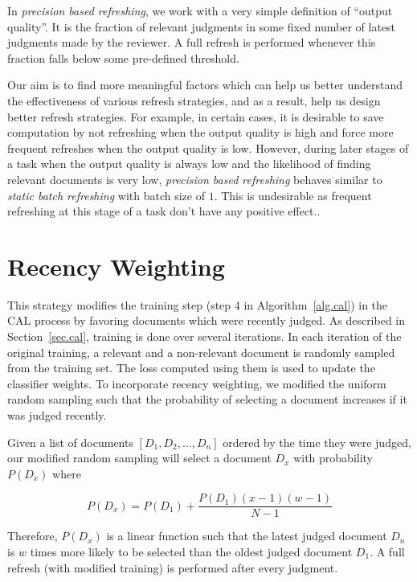 In \textit{precision based refreshing}, we work with a very simple definition of
``output quality''. It is the fraction of relevant judgments in some fixed
number of latest judgments made by the reviewer. A full refresh is performed
whenever this fraction falls below some pre-defined threshold.

Our aim is to find more meaningful factors which can help us better understand
the effectiveness of various refresh strategies, and as a result, help us design
better refresh strategies. For example, in certain cases, it is desirable to
save computation by not refreshing when the output quality is high and force
more frequent refreshes when the output quality is low. However, during later
stages of a task when the output quality is always low and the likelihood of
finding relevant documents is very low, \textit{precision based refreshing}
behaves similar to \textit{static batch refreshing} with batch size of $1$. This
is undesirable as frequent refreshing at this stage of a task don't have any
positive effect..

\section{Recency Weighting}

This strategy modifies the training step (step 4 in Algorithm~\ref{alg.cal}) in
the CAL process by favoring documents which were recently judged. As described
in Section~\ref{sec.cal}, training is done over several iterations. In each
iteration of the original training, a relevant and a non-relevant document is
randomly sampled from the training set. The loss computed using them is used to
update the classifier weights. To incorporate recency weighting, we modified the
uniform random sampling such that the probability of selecting a document
increases if it was judged recently.

Given a list of documents $[D_1, D_2, ..., D_n]$ ordered by the time
they were judged, our modified random sampling will
select a document $D_x$ with probability $P(D_x)$ where

\begin{equation*}
P(D_x) = P(D_1) + \frac{P(D_1)(x-1)(w-1)}{N-1}
\end{equation*}

Therefore, $P(D_x)$ is a linear function such that the latest judged document
$D_n$ is $w$ times more likely to be selected than the oldest judged document
$D_1$. A full refresh (with modified training) is performed after every
judgment.

